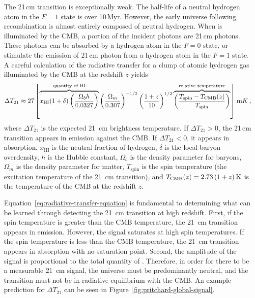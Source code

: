 \begin{bibunit}
The 21\,cm transition is exceptionally weak.  The half-life of a neutral hydrogen atom in the $F=1$
state is over 10\,Myr.  However, the early universe following recombination is almost entirely
composed of neutral hydrogen. When  is illuminated by the CMB, a portion of the incident
photons are 21\,cm photons. These photons can be absorbed by a hydrogen atom in the $F=0$ state, or
stimulate the emission of 21\,cm photon from a hydrogen atom in the $F=1$ state.  A careful
calculation of the radiative transfer for a clump of atomic hydrogen gas illuminated by the CMB at
the redshift $z$ yields \citep[neglecting the contribution of peculiar
velocities;][]{2012RPPh...75h6901P}
\begin{equation}\label{eq:radiative-transfer-equation}
    \Delta T_{21} \approx 27 \left[
        \overbrace{
            x_\text{HI} (1+\delta)
            \left(\frac{\Omega_b h}{0.0327}\right)
        }^{\text{quantity of HI}}
        \left(\frac{\Omega_m}{0.307}\right)^{-1/2}
        \left(\frac{1+z}{10}\right)^{1/2}
        \overbrace{
            \left(\frac{T_\text{spin} - T_\text{CMB}(z)}{T_\text{spin}}\right)
        }^{\text{relative temperature}}
    \right] \, {\rm mK} \,,
\end{equation}
where $\Delta T_{21}$ is the expected 21~cm brightness temperature. If $\Delta T_{21} > 0$, the
21\,cm transition appears in emission against the CMB. If $\Delta T_{21} < 0$, it appears in
absorption. $x_\text{HI}$ is the neutral fraction of hydrogen, $\delta$ is the local baryon
overdensity, $h$ is the Hubble constant, $\Omega_b$ is the density parameter for baryons, $\Omega_m$
is the density parameter for matter, $T_\text{spin}$ is the spin temperature (the excitation
temperature of the 21~cm transition), and $T_\text{CMB}(z) = 2.73\,(1+z)\,{\rm K}$ is the
temperature of the CMB at the redshift $z$.

Equation~\ref{eq:radiative-transfer-equation} is fundamental to determining what can be learned
through detecting the 21~cm transition at high redshift. First, if the spin temperature is greater
than the CMB temperature, the 21~cm transition appears in emission. However, the signal saturates at
high spin temperatures. If the spin temperature is less than the CMB temperature, the 21~cm
transition appears in absorption with no saturation point. Second, the amplitude of the signal is
proportional to the total quantity of . Therefore, in order for there to be a measurable
21~cm signal, the universe must be predominantly neutral, and the transition must not be in
radiative equilibrium with the CMB. An example prediction for $\Delta T_{21}$ can be seen in
Figure~\ref{fig:pritchard-global-signal}.


\end{bibunit}
